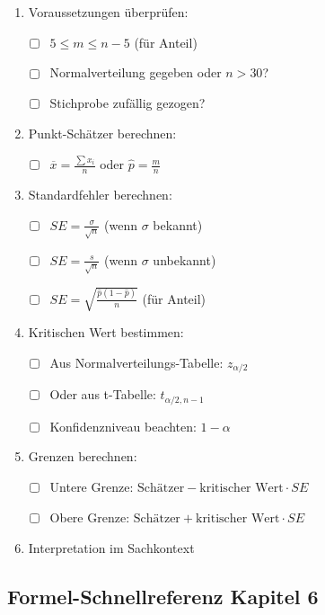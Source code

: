 \documentclass[10pt, a4paper, ngerman]{scrartcl}
\newcommand{\checkitem}[1]{\item[$\square$] #1}
\begin{document}
\begin{enumerate}
  \checkitem Voraussetzungen überprüfen:
    \begin{itemize}
      \item[] ☐ $5 \leq m \leq n-5$ (für Anteil)
      \item[] ☐ Normalverteilung gegeben oder $n > 30$?
      \item[] ☐ Stichprobe zufällig gezogen?
    \end{itemize}
  \checkitem Punkt-Schätzer berechnen:
    \begin{itemize}
      \item[] ☐ $\overline{x} = \frac{\sum x_i}{n}$ oder $\hat{p} = \frac{m}{n}$
    \end{itemize}
  \checkitem Standardfehler berechnen:
    \begin{itemize}
      \item[] ☐ $SE = \frac{\sigma}{\sqrt{n}}$ (wenn $\sigma$ bekannt)
      \item[] ☐ $SE = \frac{s}{\sqrt{n}}$ (wenn $\sigma$ unbekannt)
      \item[] ☐ $SE = \sqrt{\frac{\hat{p}(1-\hat{p})}{n}}$ (für Anteil)
    \end{itemize}
  \checkitem Kritischen Wert bestimmen:
    \begin{itemize}
      \item[] ☐ Aus Normalverteilungs-Tabelle: $z_{\alpha/2}$
      \item[] ☐ Oder aus t-Tabelle: $t_{\alpha/2, n-1}$
      \item[] ☐ Konfidenzniveau beachten: $1 - \alpha$
    \end{itemize}
  \checkitem Grenzen berechnen:
    \begin{itemize}
      \item[] ☐ Untere Grenze: $\text{Schätzer} - \text{kritischer Wert} \cdot SE$
      \item[] ☐ Obere Grenze: $\text{Schätzer} + \text{kritischer Wert} \cdot SE$
    \end{itemize}
  \checkitem Interpretation im Sachkontext
\end{enumerate}

\subsection{Formel-Schnellreferenz Kapitel 6}
\end{document}
